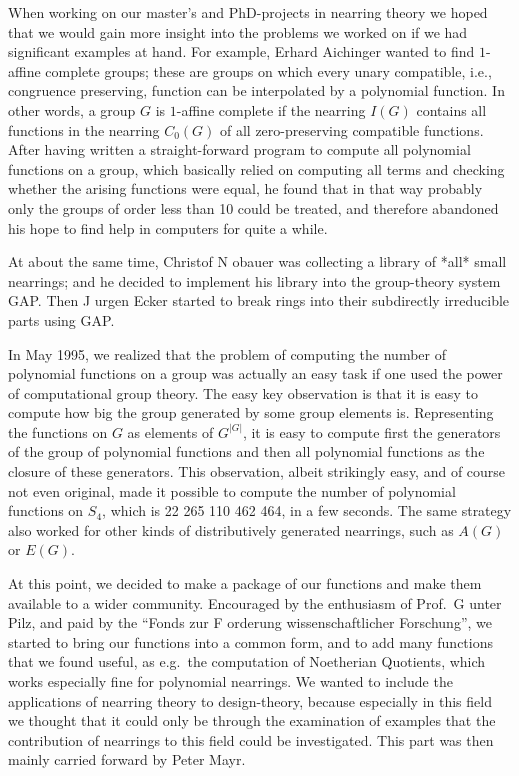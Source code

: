
\begingroup
\def\"#1{\accent127 #1}

When working on our master's and PhD-projects in nearring theory we
hoped that we would gain more insight into the problems we worked on
if we had significant examples at hand.  For example, Erhard Aichinger
wanted to find $1$-affine complete groups; these are groups on which
every unary compatible, i.e., congruence preserving, function can be
interpolated by a polynomial function. In other words, a group $G$ is
$1$-affine complete if the nearring $I(G)$ contains all functions in
the nearring $C_0(G)$ of all zero-preserving compatible functions.
After having written a straight-forward program to compute all
polynomial functions on a group, which basically relied on computing
all terms and checking whether the arising functions were equal, he
found that in that way probably only the groups of order less than 10
could be treated, and therefore abandoned his hope to find help in
computers for quite a while.

At about the same time, Christof N\"obauer was collecting a library of
*all* small nearrings; and he decided to implement his library into
the group-theory system GAP. Then J\"urgen Ecker started to break
rings into their subdirectly irreducible parts using GAP.

In May 1995, we realized that the problem of computing the number of
polynomial functions on a group was actually an easy task if one used
the power of computational group theory.  The easy key observation is
that it is easy to compute how big the group generated by some group
elements is.  Representing the functions on $G$ as elements of
$G^{|G|}$, it is easy to compute first the generators of the group of
polynomial functions and then all polynomial functions as the closure
of these generators. This observation, albeit strikingly easy, and of
course not even original, made it possible to compute the number of
polynomial functions on $S_4$, which is 22 265 110 462 464, in a few
seconds.  The same strategy also worked for other kinds of
distributively generated nearrings, such as $A(G)$ or $E(G)$.

At this point, we decided to make a package of our functions and make
them available to a wider community. Encouraged by the enthusiasm of
Prof.~G\"unter Pilz, and paid by the ``Fonds zur F\"orderung
wissenschaftlicher Forschung'', we started to bring our functions into
a common form, and to add many functions that we found useful, as
e.g.\ the computation of Noetherian Quotients, which works especially
fine for polynomial nearrings.  We wanted to include the applications
of nearring theory to design-theory, because especially in this field
we thought that it could only be through the examination of examples
that the contribution of nearrings to this field could be
investigated. This part was then mainly carried forward by Peter Mayr.

